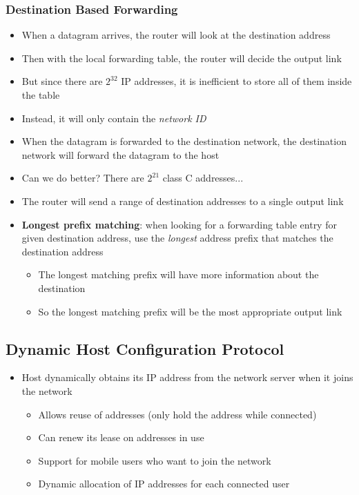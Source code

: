 \subsubsection{Destination Based Forwarding}
\begin{itemize}
	\item When a datagram arrives, the router will look at the destination address
	\item Then with the local forwarding table, the router will decide the output link
	\item But since there are \(2^{32}\) IP addresses, it is inefficient to store all of them inside the table
	\item Instead, it will only contain the \textit{network ID}
	\item When the datagram is forwarded to the destination network, the destination network will forward the datagram to the host
	\item Can we do better? There are \(2^{21}\) class C addresses...
	\item The router will send a range of destination addresses to a single output link
	\item \textbf{Longest prefix matching}: when looking for a forwarding table entry for given destination address, use the \textit{longest} address prefix that matches the destination address
	\begin{itemize}
		\item The longest matching prefix will have more information about the destination
		\item So the longest matching prefix will be the most appropriate output link
	\end{itemize}
\end{itemize}

\subsection{Dynamic Host Configuration Protocol}
\begin{itemize}
	\item Host dynamically obtains its IP address from the network server when it joins the network
	\begin{itemize}
		\item Allows reuse of addresses (only hold the address while connected)
		\item Can renew its lease on addresses in use
		\item Support for mobile users who want to join the network
		\item Dynamic allocation of IP addresses for each connected user
	\end{itemize}
\end{itemize}

